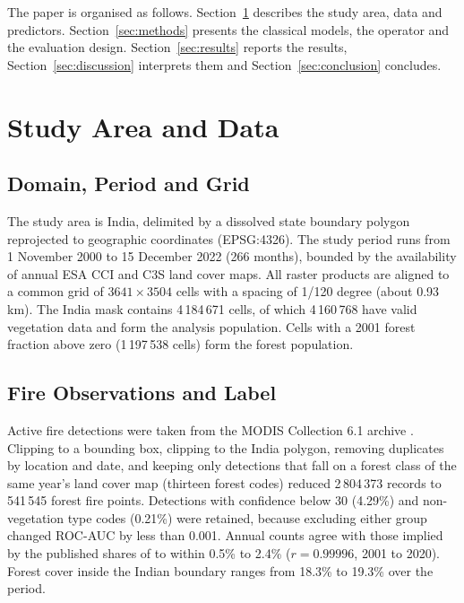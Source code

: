 \documentclass[journal]{IEEEtran}
\newcommand{\auc}{ROC-AUC}
\begin{document}
The paper is organised as follows. Section~\ref{sec:data} describes the study area, data and predictors. Section~\ref{sec:methods} presents the classical models, the operator and the evaluation design. Section~\ref{sec:results} reports the results, Section~\ref{sec:discussion} interprets them and Section~\ref{sec:conclusion} concludes.

\section{Study Area and Data}
\label{sec:data}

\subsection{Domain, Period and Grid}
The study area is India, delimited by a dissolved state boundary polygon reprojected to geographic coordinates (EPSG:4326). The study period runs from 1 November 2000 to 15 December 2022 (266 months), bounded by the availability of annual ESA CCI and C3S land cover maps. All raster products are aligned to a common grid of $3641\times3504$ cells with a spacing of 1/120 degree (about 0.93 km). The India mask contains 4\,184\,671 cells, of which 4\,160\,768 have valid vegetation data and form the analysis population. Cells with a 2001 forest fraction above zero (1\,197\,538 cells) form the forest population.

\subsection{Fire Observations and Label}
Active fire detections were taken from the MODIS Collection 6.1 archive \cite{giglio2016}. Clipping to a bounding box, clipping to the India polygon, removing duplicates by location and date, and keeping only detections that fall on a forest class of the same year's land cover map (thirteen forest codes) reduced 2\,804\,373 records to 541\,545 forest fire points. Detections with confidence below 30 (4.29\%) and non-vegetation type codes (0.21\%) were retained, because excluding either group changed \auc{} by less than 0.001. Annual counts agree with those implied by the published shares of \cite{biswas2025} to within 0.5\% to 2.4\% ($r=0.99996$, 2001 to 2020). Forest cover inside the Indian boundary ranges from 18.3\% to 19.3\% over the period.
\end{document}
